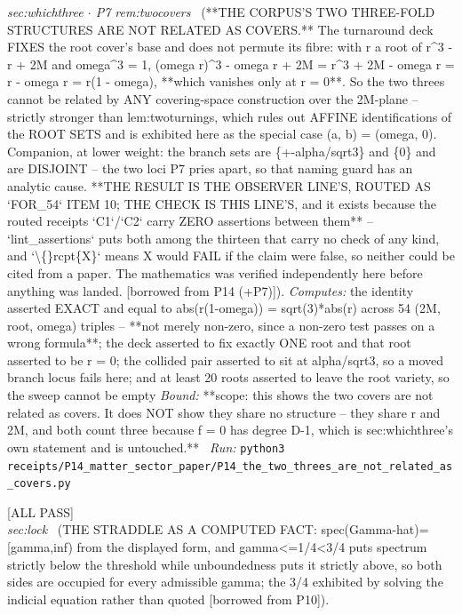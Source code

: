 \begin{description}
\textit{sec:whichthree \ensuremath{\cdot} P7 rem:twocovers} \ (**THE CORPUS'S TWO THREE-FOLD STRUCTURES ARE NOT RELATED AS COVERS.** The turnaround deck FIXES the root cover's base and does not permute its fibre: with r a root of r\textasciicircum{}3 - r + 2M and omega\textasciicircum{}3 = 1, (omega r)\textasciicircum{}3 - omega r + 2M = r\textasciicircum{}3 + 2M - omega r = r - omega r = r(1 - omega), **which vanishes only at r = 0**. So the two threes cannot be related by ANY covering-space construction over the 2M-plane -- strictly stronger than lem:twoturnings, which rules out AFFINE identifications of the ROOT SETS and is exhibited here as the special case (a, b) = (omega, 0). Companion, at lower weight: the branch sets are \{+-alpha/sqrt3\} and \{0\} and are DISJOINT -- the two loci P7 pries apart, so that naming guard has an analytic cause. **THE RESULT IS THE OBSERVER LINE'S, ROUTED AS `FOR\_54` ITEM 10; THE CHECK IS THIS LINE'S, and it exists because the routed receipts `C1`/`C2` carry ZERO assertions between them** -- `lint\_assertions` puts both among the thirteen that carry no check of any kind, and `\textbackslash\{\}rcpt\{X\}` means X would FAIL if the claim were false, so neither could be cited from a paper. The mathematics was verified independently here before anything was landed. [borrowed from P14 (+P7)]). 
\emph{Computes:} the identity asserted EXACT and equal to abs(r(1-omega)) = sqrt(3)*abs(r) across 54 (2M, root, omega) triples -- **not merely non-zero, since a non-zero test passes on a wrong formula**; the deck asserted to fix exactly ONE root and that root asserted to be r = 0; the collided pair asserted to sit at alpha/sqrt3, so a moved branch locus fails here; and at least 20 roots asserted to leave the root variety, so the sweep cannot be empty
 \emph{Bound:} **scope: this shows the two covers are not related as covers. It does NOT show they share no structure -- they share r and 2M, and both count three because f = 0 has degree D-1, which is sec:whichthree's own statement and is untouched.**
\ \emph{Run:} \texttt{python3 receipts/P14\_matter\_sector\_paper/P14\_the\_two\_threes\_are\_not\_related\_as\_covers.py}
\item[\rcptlabel{P10_the_straddle_is_computed}{P10R13}\textbf{P10R13}\quad\texttt{P10\_the\_straddle\_is\_computed}]\hfill\textsf{[ALL PASS]}\\
\textit{sec:lock} \ (THE STRADDLE AS A COMPUTED FACT: spec(Gamma-hat)=[gamma,inf) from the displayed form, and gamma<=1/4<3/4 puts spectrum strictly below the threshold while unboundedness puts it strictly above, so both sides are occupied for every admissible gamma; the 3/4 exhibited by solving the indicial equation rather than quoted [borrowed from P10]). 

\end{description}
